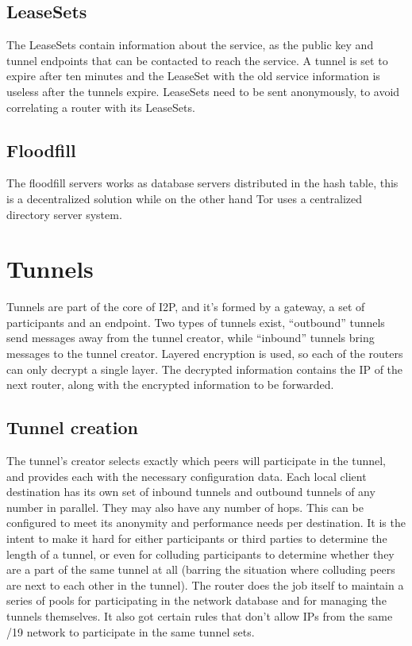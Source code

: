 \documentclass[a4paper,twocolumn,12pt]{article}
\begin{document}
\subsection{LeaseSets}

The LeaseSets contain information about the service, as the public key and
tunnel endpoints that can be contacted to reach the service. A tunnel is set to
expire after ten minutes and the LeaseSet with the old service information is
useless after the tunnels expire. LeaseSets need to be sent anonymously, to avoid
correlating a router with its LeaseSets.

\subsection{Floodfill}

The floodfill servers works as database servers distributed in the hash table,
this is a decentralized solution while on the other hand Tor\cite{tor-design}
uses a centralized directory server system.

\section{Tunnels}

Tunnels are part of the core of I2P, and it's formed by a gateway, a set of
participants and an endpoint. Two types of tunnels exist, ``outbound'' tunnels
send messages away from the tunnel creator, while ``inbound'' tunnels bring
messages to the tunnel creator.
Layered encryption is used, so each of the routers can only decrypt a single
layer. The decrypted information contains the IP of the next router, along with
the encrypted information to be forwarded.

\subsection{Tunnel creation}
The tunnel's creator selects exactly which peers will participate in the tunnel,
and provides each with the necessary configuration data. Each local client destination
has its own set of inbound tunnels and outbound tunnels of any number in parallel.
They may also have any number of hops. This can be configured to meet its anonymity and
performance needs per destination. It is the intent to make it hard for either participants or
third parties to determine the length of a tunnel, or even for colluding participants
to determine whether they are a part of the same tunnel at all (barring the situation
where colluding peers are next to each other in the tunnel). The router does the job itself
to maintain a series of pools for participating in the network database and for managing the
tunnels themselves. It also got certain rules that don't allow IPs from the same /19 network to
participate in the same tunnel sets.
\end{document}
